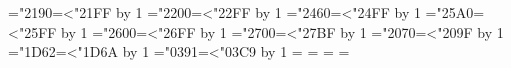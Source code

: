 \newXeTeXintercharclass\fallbackclass
{}="2190\loop\XeTeXcharclass{}=\fallbackclass\ifnum{}<"21FF\advance{} by 1\repeat
{}="2200\loop\XeTeXcharclass{}=\fallbackclass\ifnum{}<"22FF\advance{} by 1\repeat
{}="2460\loop\XeTeXcharclass{}=\fallbackclass\ifnum{}<"24FF\advance{} by 1\repeat
{}="25A0\loop\XeTeXcharclass{}=\fallbackclass\ifnum{}<"25FF\advance{} by 1\repeat
{}="2600\loop\XeTeXcharclass{}=\fallbackclass\ifnum{}<"26FF\advance{} by 1\repeat
{}="2700\loop\XeTeXcharclass{}=\fallbackclass\ifnum{}<"27BF\advance{} by 1\repeat
{}="2070\loop\XeTeXcharclass{}=\fallbackclass\ifnum{}<"209F\advance{} by 1\repeat
{}="1D62\loop\XeTeXcharclass{}=\fallbackclass\ifnum{}<"1D6A\advance{} by 1\repeat
{}="0391\loop\XeTeXcharclass{}=\fallbackclass\ifnum{}<"03C9\advance{} by 1\repeat
{} \fallbackclass = {\begingroup\symbolfont}
 \fallbackclass = {\begingroup\symbolfont}
\XeTeXinterchartoks {} = {\endgroup}
\XeTeXinterchartoks {} = {\endgroup}
